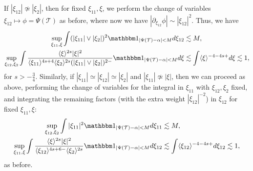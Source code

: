 \documentclass[%
11pt,  reqno]{amsart}
\newcommand{\5}{\textup{V}}
\newcommand{\ind}{\mathbbm 1}
\newcommand{\les}{\lesssim}
\theoremstyle{remark}
\newcommand{\TT}{\mathcal{T}}
\newcommand{\al}{\alpha}
\newcommand{\jb}[1]
{\langle #1 \rangle}
\numberwithin{equation}{section}
\numberwithin{theorem}{section}
\begin{document}
If $|\xi_{12}| \not \simeq |\xi_2|$, then for fixed $\xi_{11}, \xi$, we perform the change of variables $\xi_{12} \mapsto \phi = \Psi(\TT)$ as before, where now we have $|\partial_{\xi_{12}} \phi | \sim |\xi_{12}|^2$. Thus, we have 
\begin{align}
    \sup_{\xi_{11}, \xi} \int 
(|\xi_{11}| \lor |\xi_2|)^2 \ind_{|\Psi(\TT) - \al| < M } d \xi_{12}
    &
    \les M
    , 
    \\
    \sup_{\xi_{12}, \xi_2} 
    \int 
    \frac{\jb{\xi}^{2s} |\xi|^2 }{\jb{\xi_{11}}^{4s+4} \jb{\xi_2}^{2s} (|\xi_{11}| \lor |\xi_2|)^{2-}} \ind_{|\Psi(\TT) - \al| < M } 
    d\xi
    &
    \les \int \jb{\xi}^{-4-4s+} d\xi \les 1 , 
\end{align}
for $s>-\frac34$.  
Similarly, 
if $|\xi_{11}|\simeq |\xi_{12}| \simeq |\xi_2|$ and $|\xi_{11}| \not \simeq |\xi|$, then we can proceed as above, performing the change of variables for the integral in $\xi_{11}$ with $\xi_{12},\xi_2$ fixed, and integrating the remaining factors (with the extra weight $|\xi_{12}|^{-2}$) in $\xi_{12}$ for fixed $\xi_{11},\xi$:
\begin{align}
    \sup_{\xi_{12}, \xi_2} \int |\xi_{11}|^2 \ind_{|\Psi(\TT) - \al| < M } d\xi_{11} 
    & \les M 
    ,
    \\
    \sup_{\xi_{11}, \xi} \int \frac{\jb{\xi}^{2s} |\xi|^2 }{\jb{\xi_{12}}^{4s+6 -} \jb{\xi_2}^{2s}} \ind_{|\Psi(\TT) - \al| < M } d\xi_{12 } 
    &
    \les 
    \int \jb{\xi_{12}}^{-4-4s+} d\xi_{12} \les 1, 
\end{align}
as before.
\end{document}
